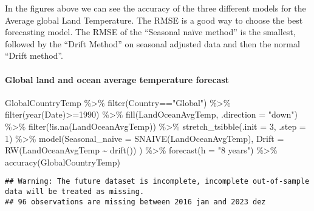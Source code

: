 \documentclass[
]{article}
\newenvironment{Shaded}{\begin{snugshade}}{\end{snugshade}}
\newcommand{\AttributeTok}[1]{\textcolor[rgb]{0.77,0.63,0.00}{#1}}
\newcommand{\DecValTok}[1]{\textcolor[rgb]{0.00,0.00,0.81}{#1}}
\newcommand{\FunctionTok}[1]{\textcolor[rgb]{0.00,0.00,0.00}{#1}}
\newcommand{\NormalTok}[1]{#1}
\newcommand{\SpecialCharTok}[1]{\textcolor[rgb]{0.00,0.00,0.00}{#1}}
\newcommand{\StringTok}[1]{\textcolor[rgb]{0.31,0.60,0.02}{#1}}
\begin{document}
In the figures above we can see the accuracy of the three different
models for the Average global Land Temperature. The RMSE is a good way
to choose the best forecasting model. The RMSE of the ``Seasonal naïve
method'' is the smallest, followed by the ``Drift Method'' on seasonal
adjusted data and then the normal ``Drift method''.

\hypertarget{global-land-and-ocean-average-temperature-forecast}{%
\paragraph{Global land and ocean average temperature
forecast}\label{global-land-and-ocean-average-temperature-forecast}}

\begin{Shaded}
\begin{Highlighting}[]
\NormalTok{GlobalCountryTemp }\SpecialCharTok{\%\textgreater{}\%} 
  \FunctionTok{filter}\NormalTok{(Country}\SpecialCharTok{==}\StringTok{"Global"}\NormalTok{) }\SpecialCharTok{\%\textgreater{}\%} 
  \FunctionTok{filter}\NormalTok{(}\FunctionTok{year}\NormalTok{(Date)}\SpecialCharTok{\textgreater{}=}\DecValTok{1990}\NormalTok{) }\SpecialCharTok{\%\textgreater{}\%}
  \FunctionTok{fill}\NormalTok{(LandOceanAvgTemp, }\AttributeTok{.direction =} \StringTok{"down"}\NormalTok{) }\SpecialCharTok{\%\textgreater{}\%}
  \FunctionTok{filter}\NormalTok{(}\SpecialCharTok{!}\FunctionTok{is.na}\NormalTok{(LandOceanAvgTemp)) }\SpecialCharTok{\%\textgreater{}\%}
  \FunctionTok{stretch\_tsibble}\NormalTok{(}\AttributeTok{.init =} \DecValTok{3}\NormalTok{, }\AttributeTok{.step =} \DecValTok{1}\NormalTok{) }\SpecialCharTok{\%\textgreater{}\%} 
  \FunctionTok{model}\NormalTok{(}\AttributeTok{Seasonal\_naive =} \FunctionTok{SNAIVE}\NormalTok{(LandOceanAvgTemp),}
        \AttributeTok{Drift =} \FunctionTok{RW}\NormalTok{(LandOceanAvgTemp }\SpecialCharTok{\textasciitilde{}} \FunctionTok{drift}\NormalTok{())}
\NormalTok{        ) }\SpecialCharTok{\%\textgreater{}\%} \FunctionTok{forecast}\NormalTok{(}\AttributeTok{h =} \StringTok{"8 years"}\NormalTok{) }\SpecialCharTok{\%\textgreater{}\%} 
  \FunctionTok{accuracy}\NormalTok{(GlobalCountryTemp)}
\end{Highlighting}
\end{Shaded}

\begin{verbatim}
## Warning: The future dataset is incomplete, incomplete out-of-sample data will be treated as missing. 
## 96 observations are missing between 2016 jan and 2023 dez
\end{verbatim}
\end{document}
